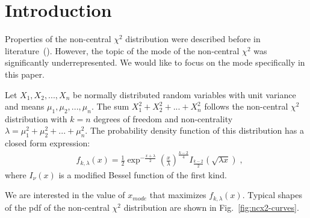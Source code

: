 \documentclass[final,5p,twocolumn,times,authoryear]{elsarticle}
\begin{document}

\section{Introduction}\label{introduction}
Properties of the non-central $\chi^2$ distribution were described before in literature~(\cite{Andrs2008, hogan2013, Saulis2001}). However, the topic of the mode of the non-central $\chi^2$ was significantly underrepresented. We would like to focus on the mode specifically in this paper.

Let $X_1, X_2, ..., X_n$ be normally distributed random variables with unit variance and means $\mu_1, \mu_2, ..., \mu_n$. The sum $X_1^2 + X_2^2 + ... + X_n^2$ follows the non-central $\chi^2$ distribution with $k = n$ degrees of freedom and non-centrality $\lambda = \mu_1^2 + \mu_2^2 + ... + \mu_n^2$. The probability density function of this distribution has a closed form expression:
%
\begin{align}
    &f_{k, \lambda}(x) = \frac{1}{2} \exp^{-\frac{x + \lambda}{2}} \left(\frac{x}{\lambda}\right)^{\frac{k-2}{4}} I_{\frac{k-2}{2}}(\sqrt{\lambda x})\;,
\end{align}
%
where $I_{\nu}(x)$ is a modified Bessel function of the first kind.

We are interested in the value of $x_{mode}$ that maximizes $f_{k, \lambda}(x)$. Typical shapes of the pdf of the non-central $\chi^2$ distribution are shown in Fig.~\ref{fig:ncx2-curves}.
\end{document}
